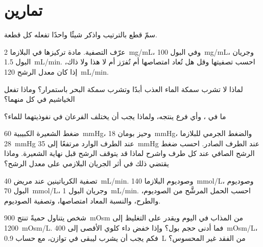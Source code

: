 \section{تمارين}

\begin{exercise}[$\star$]\label{exo:b3:renal-osmoregulation:1}
سمّ قطع  بالترتيب واذكر شيئًا واحدًا تفعله كل قطعة.
\end{exercise}

\begin{exercise}[$\star$]\label{exo:b3:renal-osmoregulation:2}
عرّف التصفية. مادة تركيزها في البلازما \qty{2}{mg/mL}، وفي
البول \qty{100}{mg/mL}، وجريان البول \qty{1.5}{mL/min}. احسب
تصفيتها وقل هل تُعاد امتصاصها أم تُفرَز أم لا هذا ولا ذاك،
إذا كان معدل الرشح \qty{120}{mL/min}.
\end{exercise}

\begin{exercise}[$\star$]\label{exo:b3:renal-osmoregulation:3}
لماذا لا تشرب سمكة الماء العذب أبدًا وتشرب سمكة البحر
باستمرار؟ وماذا تفعل الخياشيم في كل منهما؟
\end{exercise}

\begin{exercise}[$\star$]\label{exo:b3:renal-osmoregulation:4}
ما  في ، وأي فرع ينتجه، ولماذا يجب أن
يختلف الفرعان في نفوذيتهما للماء؟
\end{exercise}

\begin{exercise}[$\star\star$]\label{exo:b3:renal-osmoregulation:5}
ضغط الشعيرة الكبيبية \qty{60}{mmHg}، وحيز بومان
\qty{18}{mmHg}، والضغط الجرمي للبلازما \qty{28}{mmHg} عند
الطرف الوارد مرتفعًا إلى \qty{35}{mmHg} عند الطرف الصادر.
احسب ضغط الرشح الصافي عند كل طرف واشرح لماذا قد يتوقف الرشح
قبل نهاية الشعيرة. وماذا يقتضي ذلك في أثر الجريان البلازمي
على معدل الرشح؟
\end{exercise}

\begin{exercise}[$\star\star$]\label{exo:b3:renal-osmoregulation:6}
تصفية الكرياتينين عند مريض \qty{40}{mL/min}. وصوديوم البلازما
\qty{140}{mmol/L}، وصوديوم البول \qty{70}{mmol/L}، وجريان البول
\qty{1}{mL/min}. احسب الحمل المرشَّح من الصوديوم، والطرح،
والنسبة المعاد امتصاصها، وتصفية الصوديوم.
\end{exercise}

\begin{exercise}[$\star\star$]\label{exo:b3:renal-osmoregulation:7}
شخص يتناول حميةً تنتج \qty{900}{mOsm} من المذاب في اليوم ويقدر
على التغليظ إلى \qty{1200}{mOsm/L}. فما أدنى حجم بول؟ وإذا خفض
داء كلوي الأقصى إلى \qty{400}{mOsm/L}، فكم يجب أن يشرب ليبقى
في توازن، مع حساب \qty{0.9}{L} من الفقد غير المحسوس؟
\end{exercise}

